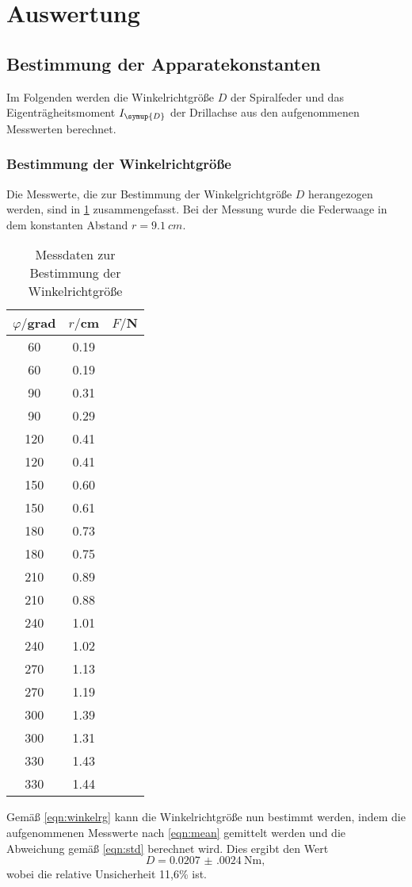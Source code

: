\section{Auswertung}
\label{sec:Auswertung}
\subsection{Bestimmung der Apparatekonstanten}
Im Folgenden werden die Winkelrichtgröße $D$ der Spiralfeder und das
Eigenträgheitsmoment $I_{\symup{D}}$ der Drillachse aus den aufgenommenen
Messwerten berechnet.
\subsubsection{Bestimmung der Winkelrichtgröße}
Die Messwerte, die zur Bestimmung der Winkelgrichtgröße $D$ herangezogen werden,
sind in \ref{tab:winkelrichtgroesse} zusammengefasst. Bei der Messung wurde die
Federwaage in dem konstanten Abstand $r=\SI{9.1}{cm}$.
\begin{table}
\centering
\caption{Messdaten zur Bestimmung der Winkelrichtgröße}
\label{tab:winkelrichtgroesse}
\begin{tabular}{c c c}
\toprule
$\varphi/$grad & $r/$cm & $F/$N \\
\midrule
 60	& 0.19 \\
 60	& 0.19 \\
 90	& 0.31 \\
 90	& 0.29 \\
120 &	0.41 \\
120 &	0.41 \\
150 &	0.60 \\
150 &	0.61 \\
180 &	0.73 \\
180 &	0.75 \\
210 &	0.89 \\
210 &	0.88 \\
240 &	1.01 \\
240 &	1.02 \\
270 &	1.13 \\
270 &	1.19 \\
300 &	1.39 \\
300 &	1.31 \\
330 &	1.43 \\
330 &	1.44 \\
\bottomrule
\end{tabular}
\end{table}
Gemäß \eqref{eqn:winkelrg} kann die Winkelrichtgröße nun bestimmt werden, indem
die aufgenommenen Messwerte nach \eqref{eqn:mean} gemittelt werden und die
Abweichung gemäß \eqref{eqn:std} berechnet wird. Dies ergibt den Wert
\begin{equation}
  D = \SI{0.0207(0024)}{\newton\meter},
\end{equation}
wobei die relative Unsicherheit 11,6\% ist.
